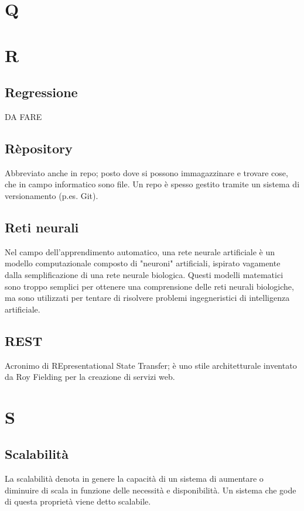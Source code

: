 \section*{Q}

\section*{R}
\subsection*{Regressione}
DA FARE

\subsection*{Rèpository}
Abbreviato anche in repo; posto dove si possono immagazzinare e trovare cose, che in campo informatico sono file. Un repo è spesso gestito tramite un sistema di versionamento (p.es. Git\glo).

\subsection*{Reti neurali}
Nel campo dell'apprendimento automatico, una rete neurale artificiale  è un modello computazionale composto di "neuroni" artificiali, ispirato vagamente dalla semplificazione di una rete neurale biologica. Questi modelli matematici sono troppo semplici per ottenere una comprensione delle reti neurali biologiche, ma sono utilizzati per tentare di risolvere problemi ingegneristici di intelligenza artificiale.


\subsection*{REST}
Acronimo di REpresentational State Transfer; è uno stile architetturale inventato da Roy Fielding per la creazione di servizi web.

\section*{S}

\subsection*{Scalabilità}
La scalabilità denota in genere la capacità di un sistema di aumentare o diminuire di scala in funzione delle necessità e disponibilità. Un sistema che gode di questa proprietà viene detto scalabile.

